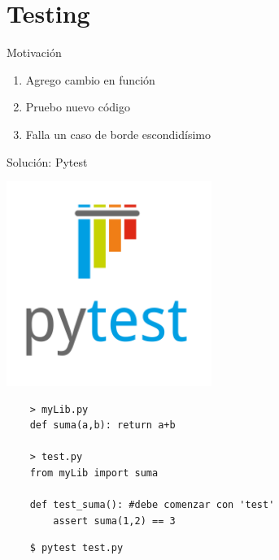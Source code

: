 \documentclass[14pt,aspectratio=169,xcolor=dvipsnames]{beamer}
\begin{document}
\section{Testing}
\begin{frame}{Motivación}
    \begin{enumerate}
        \item Agrego cambio en función
        \item Pruebo nuevo código
        \item Falla un caso de borde escondidísimo
    \end{enumerate}

\end{frame}
\begin{frame}{Solución: Pytest}
    \begin{center}
        \includegraphics[width=0.5\textwidth]{../images/pytest.png}
    \end{center}
\end{frame}
\begin{frame}[fragile]

    \begin{verbatim}
    > myLib.py
    def suma(a,b): return a+b

    > test.py
    from myLib import suma
    
    def test_suma(): #debe comenzar con 'test'
        assert suma(1,2) == 3
    \end{verbatim}
    \begin{verbatim}
    $ pytest test.py
    \end{verbatim}
\end{frame}
\end{document}
